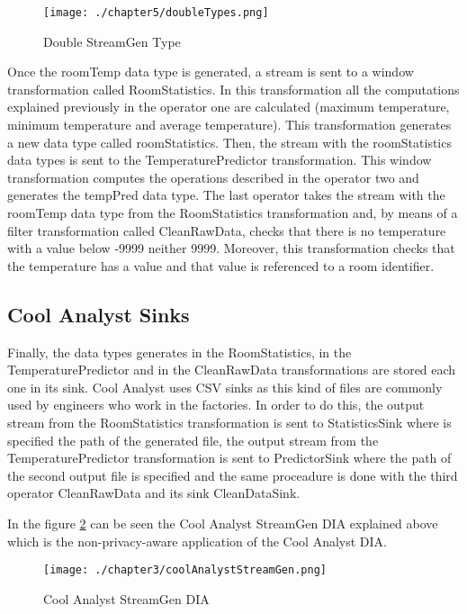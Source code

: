 \begin{figure}
\centering
{\texttt{[image: ./chapter5/doubleTypes.png]}}
\caption{Double StreamGen Type}
\label{fig:Double StreamGen Type}
\end{figure}

Once the roomTemp data type is generated, a stream is sent to a window transformation called RoomStatistics. In this transformation all the computations explained previously in the operator one are calculated (maximum temperature, minimum temperature and average temperature). This transformation generates a new data type called roomStatistics. Then, the stream with the roomStatistics data types is sent to the TemperaturePredictor transformation. This window transformation computes the operations described in the operator two and generates the tempPred data type. The last operator takes the stream with the roomTemp data type from the RoomStatistics transformation and, by means of a filter transformation called CleanRawData, checks that there is no temperature with a value below -9999 neither 9999. Moreover, this transformation checks that the temperature has a value and that value is referenced to a room identifier.

\subsection{Cool Analyst Sinks}

Finally, the data types generates in the RoomStatistics, in the TemperaturePredictor and in the CleanRawData transformations are stored each one in its sink. Cool Analyst uses CSV sinks as this kind of files are commonly used by engineers who work in the factories. In order to do this, the output stream from the RoomStatistics transformation is sent to StatisticsSink where is specified the path of the generated file, the output stream from the TemperaturePredictor transformation is sent to PredictorSink where the path of the second output file is specified and the same proceadure is done with the third operator CleanRawData and its sink CleanDataSink.

In the figure \ref{fig:Cool Analyst StreamGen DIA} can be seen the Cool Analyst StreamGen DIA explained above which is the non-privacy-aware application of the Cool Analyst DIA.

\begin{figure}
\centering
{\texttt{[image: ./chapter3/coolAnalystStreamGen.png]}}
\caption{Cool Analyst StreamGen DIA}
\label{fig:Cool Analyst StreamGen DIA}
\end{figure}

